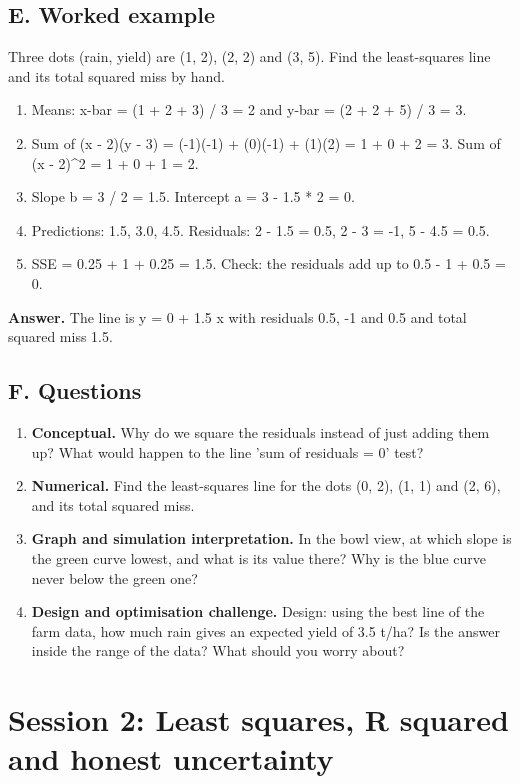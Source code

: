 \documentclass[11pt,a4paper]{article}
\begin{document}
\subsection*{E. Worked example}
Three dots (rain, yield) are (1, 2), (2, 2) and (3, 5). Find the least-squares line and its total squared miss by hand.
\begin{enumerate}[nosep]
\item Means: x-bar = (1 + 2 + 3) / 3 = 2 and y-bar = (2 + 2 + 5) / 3 = 3.
\item Sum of (x - 2)(y - 3) = (-1)(-1) + (0)(-1) + (1)(2) = 1 + 0 + 2 = 3. Sum of (x - 2)\textasciicircum{}2 = 1 + 0 + 1 = 2.
\item Slope b = 3 / 2 = 1.5. Intercept a = 3 - 1.5 * 2 = 0.
\item Predictions: 1.5, 3.0, 4.5. Residuals: 2 - 1.5 = 0.5, 2 - 3 = -1, 5 - 4.5 = 0.5.
\item SSE = 0.25 + 1 + 0.25 = 1.5. Check: the residuals add up to 0.5 - 1 + 0.5 = 0.
\end{enumerate}
\textbf{Answer.} The line is y = 0 + 1.5 x with residuals 0.5, -1 and 0.5 and total squared miss 1.5.

\subsection*{F. Questions}
\begin{enumerate}[nosep]
\item \textbf{Conceptual.} Why do we square the residuals instead of just adding them up? What would happen to the line 'sum of residuals = 0' test?
\item \textbf{Numerical.} Find the least-squares line for the dots (0, 2), (1, 1) and (2, 6), and its total squared miss.
\item \textbf{Graph and simulation interpretation.} In the bowl view, at which slope is the green curve lowest, and what is its value there? Why is the blue curve never below the green one?
\item \textbf{Design and optimisation challenge.} Design: using the best line of the farm data, how much rain gives an expected yield of 3.5 t/ha? Is the answer inside the range of the data? What should you worry about?
\end{enumerate}

\section{Session 2: Least squares, R squared and honest uncertainty}
\end{document}
